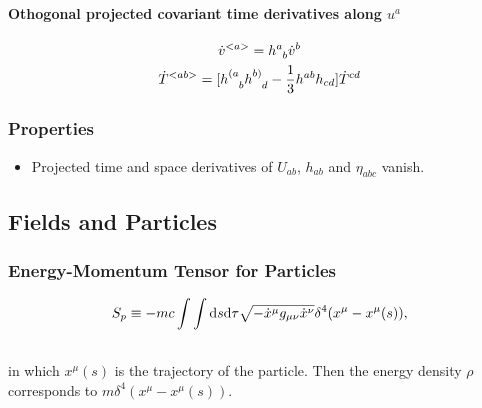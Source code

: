 \documentclass[letterpaper,10pt,english]{sphinxmanual}
\begin{document}
\paragraph{Othogonal projected covariant time derivatives along $u^a$}
\label{relativity/GeneralRelativity:othogonal-projected-covariant-time-derivatives-along}\begin{gather}
\begin{split}\dot v^{<a>} = h^a_{\phantom a b} \dot v^b\end{split}\notag\\\begin{split}\dot T^{<ab>} = [ h^{(a}_{\phantom{(a}b} h^{b)}_{\phantom{b)} d} - \frac 1 3 h^{ab}h_{cd} ]\dot T^{cd}\end{split}\notag
\end{gather}

\subsubsection{Properties}
\label{relativity/GeneralRelativity:properties}\begin{itemize}
\item {} 
Projected time and space derivatives of $U_{ab}$, $h_{ab}$ and $\eta_{abc}$ vanish.

\end{itemize}


\subsection{Fields and Particles}
\label{relativity/GeneralRelativity:fields-and-particles}

\subsubsection{Energy-Momentum Tensor for Particles}
\label{relativity/GeneralRelativity:energy-momentum-tensor-for-particles}\begin{gather}
\begin{split}S_p \equiv -m c \int \int \mathrm d s\mathrm d\tau \sqrt{-\dot x ^\mu g_{\mu\nu} \dot x^\nu} \delta^4(x^\mu - x^\mu (s))    ,\end{split}\notag\\\begin{split}\end{split}\notag
\end{gather}
in which $x^\mu(s)$ is the trajectory of the particle. Then the energy density $\rho$ corresponds to $m\delta^4(x^\mu- x^\mu(s))$.
\end{document}
